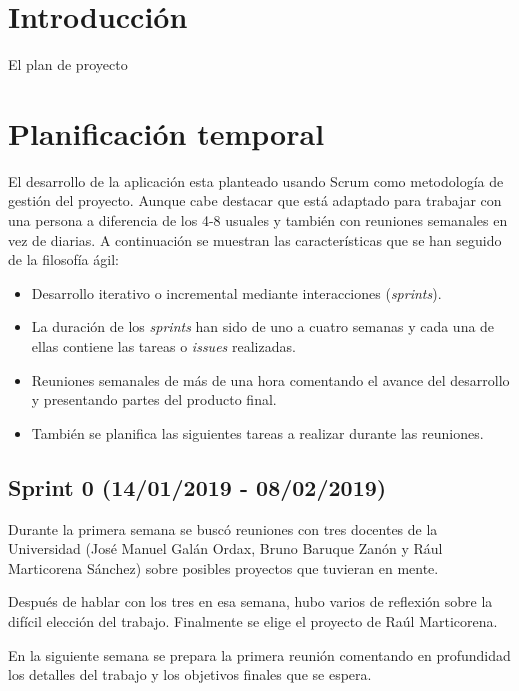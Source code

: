 
\section{Introducción}

El plan de proyecto 

\section{Planificación temporal}

El desarrollo de la aplicación esta planteado usando Scrum como metodología de gestión del proyecto. Aunque cabe destacar que está adaptado para trabajar con una persona a diferencia de los 4-8 usuales y también con reuniones semanales en vez de diarias. A continuación se muestran las características que se han seguido de la filosofía ágil:


\begin{itemize}
	\item Desarrollo iterativo o incremental mediante interacciones (\textit{sprints}).
	\item La duración de los \textit{sprints} han sido de uno a cuatro semanas y cada una de ellas contiene las tareas o \textit{issues} realizadas.
	\item Reuniones semanales de más de una hora comentando el avance del desarrollo y presentando partes del producto final.
	\item También se planifica las siguientes tareas a realizar durante las reuniones.
	
\end{itemize}

\subsection{Sprint 0 (14/01/2019 - 08/02/2019)}

Durante la primera semana se buscó reuniones con tres docentes de la Universidad (José Manuel Galán Ordax, Bruno Baruque Zanón y Rául Marticorena Sánchez) sobre posibles proyectos que tuvieran en mente.

Después de hablar con los tres en esa semana, hubo varios de reflexión sobre la difícil elección del trabajo. Finalmente se elige el proyecto de Raúl Marticorena.

En la siguiente semana se prepara la primera reunión comentando en profundidad los detalles del trabajo y los objetivos finales que se espera.

